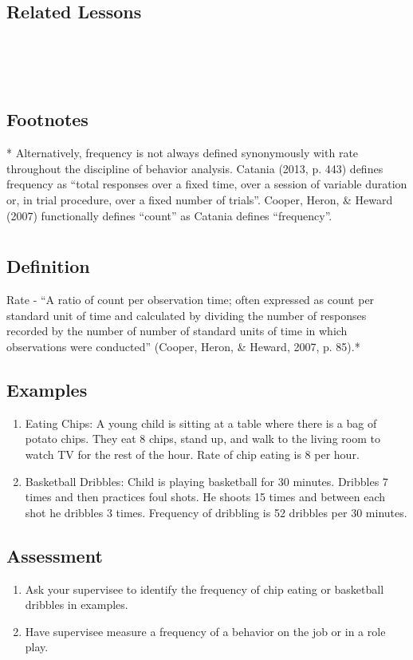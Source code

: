 \section{Related Lessons} 
\fouriOne{}\\
\fourhOne{}\\
\fourFKFourtySeven{}\\
%
\section{Footnotes}
* Alternatively, frequency is not always defined synonymously with rate throughout the discipline of behavior analysis. Catania (2013, p. 443) defines frequency as ``total responses over a fixed time, over a session of variable duration or, in trial procedure, over a fixed number of trials''. Cooper, Heron, \& Heward (2007) functionally defines ``count'' as Catania defines ``frequency''.
%
%
\chapter{\fouraTwo{}}
%
%
\section{Definition}
Rate - ``A ratio of count per observation time; often expressed as count per standard unit of time and calculated by dividing the number of responses recorded by the number of number of standard units of time in which observations were conducted'' (Cooper, Heron, \& Heward, 2007, p. 85).*
%
\section{Examples}
\begin{enumerate}
\item    Eating Chips: A young child is sitting at a table where there is a bag of potato chips. They eat 8 chips, stand up, and walk to the living room to watch TV for the rest of the hour. Rate of chip eating is 8 per hour.
\item Basketball Dribbles: Child is playing basketball for 30 minutes. Dribbles 7 times and then practices foul shots. He shoots 15 times and between each shot he dribbles 3 times. Frequency of dribbling is 52 dribbles per 30 minutes.
\end{enumerate}

\section{Assessment} 
\begin{enumerate}
\item Ask your supervisee to identify the frequency of chip eating or basketball dribbles in examples.
\item Have supervisee measure a frequency of a behavior on the job or in a role play.
\end{enumerate}


